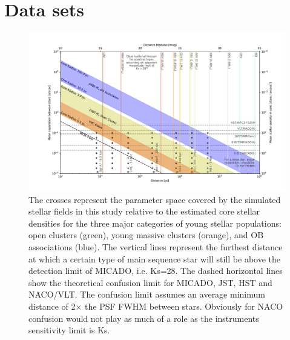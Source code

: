 \section{Data sets}
\label{sec:observations}


\begin{figure}

    \centering
    \includegraphics[width=\textwidth]{images/resolved_stellar_densities}

    \caption{The crosses represent the parameter space covered by the simulated stellar fields in this study relative to the estimated core stellar densities for the three major categories of young stellar populations: open clusters (green), young massive clusters (orange), and OB associations (blue). The vertical lines represent the furthest distance at which a certain type of main sequence star will still be above the detection limit of MICADO, i.e. Ks=28\m. The dashed horizontal lines show the theoretical confusion limit for MICADO, JST, HST and NACO/VLT. The confusion limit assumes an average minimum distance of 2$\times$ the PSF FWHM between stars. Obviously for NACO confusion would not play as much of a role as the instruments sensitivity limit is Ks\m.}
    
    \label{fig:resolved_stellar_densities}
    
\end{figure}



